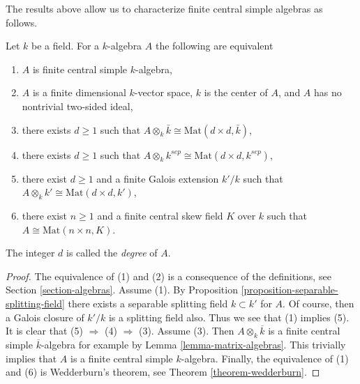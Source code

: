 \noindent
The results above allow us to characterize finite central simple algebras
as follows.

\begin{lemma}
\label{lemma-finite-central-simple-algebra}
Let $k$ be a field. For a $k$-algebra $A$ the following are equivalent
\begin{enumerate}
\item $A$ is finite central simple $k$-algebra,
\item $A$ is a finite dimensional $k$-vector space, $k$ is the center of $A$,
and $A$ has no nontrivial two-sided ideal,
\item there exists $d \geq 1$ such that
$A \otimes_k \bar k \cong \text{Mat}(d \times d, \bar k)$,
\item there exists $d \geq 1$ such that
$A \otimes_k k^{sep} \cong \text{Mat}(d \times d, k^{sep})$,
\item there exist $d \geq 1$ and a finite Galois extension $k'/k$
such that
$A \otimes_k k' \cong \text{Mat}(d \times d, k')$,
\item there exist $n \geq 1$ and a finite central skew field $K$
over $k$ such that $A \cong \text{Mat}(n \times n, K)$.
\end{enumerate}
The integer $d$ is called the {\it degree} of $A$.
\end{lemma}

\begin{proof}
The equivalence of (1) and (2) is a consequence of the definitions, see
Section \ref{section-algebras}.
Assume (1). By
Proposition \ref{proposition-separable-splitting-field}
there exists a separable splitting field $k \subset k'$ for $A$.
Of course, then a Galois closure of $k'/k$ is a splitting field also.
Thus we see that (1) implies (5). It is clear that (5) $\Rightarrow$ (4)
$\Rightarrow$ (3). Assume (3). Then $A \otimes_k \overline{k}$
is a finite central simple $\overline{k}$-algebra for example by
Lemma \ref{lemma-matrix-algebras}.
This trivially implies that $A$ is a finite central simple $k$-algebra.
Finally, the equivalence of (1) and (6) is Wedderburn's theorem, see
Theorem \ref{theorem-wedderburn}.
\end{proof}
















